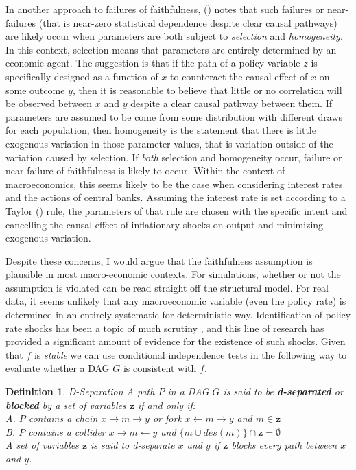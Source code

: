 \documentclass{article}
\newtheorem{definition}{Definition}
\begin{document}
In another approach to failures of faithfulness, \citeauthor{steel2006homogeneity} (\citeyear{steel2006homogeneity}) notes that such failures or near-failures (that is near-zero statistical dependence despite clear causal pathways) are likely occur when parameters are both subject to \textit{selection} and \textit{homogeneity}. In this context, selection means that parameters are entirely determined by an economic agent. The suggestion is that if the path of a policy variable $z$ is specifically designed as a function of $x$ to counteract the causal effect of $x$ on some outcome $y$, then it is reasonable to believe that little or no correlation will be observed between $x$ and $y$ despite a clear causal pathway between them. If parameters are assumed to be come from some distribution with different draws for each population, then homogeneity is the statement that there is little exogenous variation in those parameter values, that is variation outside of the variation caused by selection. If \textit{both} selection and homogeneity occur, failure or near-failure of faithfulness is likely to occur. Within the context of macroeconomics, this seems likely to be the case when considering interest rates and the actions of central banks. Assuming the interest rate is set according to a Taylor (\citeyear{taylor1993discretion}) rule, the parameters of that rule are chosen with the specific intent and cancelling the causal effect of inflationary shocks on output and minimizing exogenous variation. 

Despite these concerns, I would argue that the faithfulness assumption is plausible in most macro-economic contexts. For simulations, whether or not the assumption is violated can be read straight off the structural model. For real data, it seems unlikely that any macroeconomic variable (even the policy rate) is determined in an entirely systematic for deterministic way. Identification of policy rate shocks has been a topic of much scrutiny \parencite{ramey2016handbook}, and this line of research has provided a significant amount of evidence for the existence of such shocks. Given that $f$ is \textit{stable} we can use conditional independence tests in the following way to evaluate whether a DAG $G$ is consistent with $f$.

\begin{definition}{D-Separation}
  A path $P$ in a DAG $G$ is said to be \textbf{d-separated} or \textbf{blocked} by a set of variables $\mathbf{z}$ if and only if: \\
  A. $P$ contains a chain $x \rightarrow m \rightarrow y$ or fork $x \leftarrow m \rightarrow y$ and $m \in \mathbf{z}$ \\
  B. $P$ contains a collider $x \rightarrow m \leftarrow y$ and $\{m \cup des(m)\} \cap \mathbf{z} = \emptyset$ \\
  A set of variables $\mathbf{z}$ is said to \textit{d-separate} $x$ and $y$ if $\mathbf{z}$ blocks every path between $x$ and $y$.
  \parencite[p.16]{pearl2009causality}
  \label{dseparation}
\end{definition}
\end{document}
